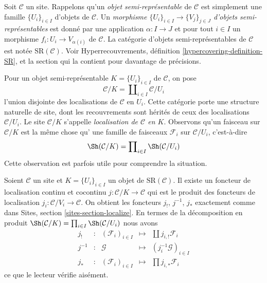 \noindent
Soit $\mathcal{C}$ un site. Rappelons qu'un {\it objet semi-représentable}
de $\mathcal{C}$ est simplement une famille $\{U_i\}_{i \in I}$
d'objets de $\mathcal{C}$. Un
{\it morphisme $\{U_i\}_{i \in I} \to \{V_j\}_{j \in J}$ d'objets
semi-représentables} est donné par une application $\alpha : I \to J$
et pour tout $i \in I$ un morphisme $f_i : U_i \to V_{\alpha(i)}$
de $\mathcal{C}$.
La catégorie d'objets semi-représentables de $\mathcal{C}$
est notée $\text{SR}(\mathcal{C})$.
Voir Hyperrecouvrements, définition \ref{hypercovering-definition-SR},
et la section qui la contient pour davantage de précisions.

\medskip\noindent
Pour un objet semi-représentable $K = \{U_i\}_{i \in I}$ de $\mathcal{C}$,
on pose
$$
\mathcal{C}/K = \coprod\nolimits_{i \in I} \mathcal{C}/U_i
$$
l'union disjointe des localisations de $\mathcal{C}$ en $U_i$.
Cette catégorie porte une structure naturelle de site, dont les recouvrements sont
hérités de ceux des localisations $\mathcal{C}/U_i$.
Le site $\mathcal{C}/K$ s'appelle
{\it localisation de $\mathcal{C}$ en $K$}.
Observons qu'un faisceau sur $\mathcal{C}/K$ est la même chose qu'
une famille de faisceaux $\mathcal{F}_i$ sur $\mathcal{C}/U_i$, c'est-à-dire
$$
\Sh(\mathcal{C}/K) = \prod\nolimits_{i \in I} \Sh(\mathcal{C}/U_i)
$$
Cette observation est parfois utile pour comprendre la situation.

\medskip\noindent
Soient $\mathcal{C}$ un site et $K = \{U_i\}_{i \in I}$ un objet de
$\text{SR}(\mathcal{C})$. Il existe un foncteur de localisation
continu et cocontinu $j : \mathcal{C}/K \to \mathcal{C}$ qui est
le produit des foncteurs de localisation
$j_i : \mathcal{C}/V_i \to \mathcal{C}$.
On obtient les foncteurs $j_!$, $j^{-1}$, $j_*$ exactement
comme dans Sites, section \ref{sites-section-localize}.
En termes de la décomposition en produit
$\Sh(\mathcal{C}/K) = \prod\nolimits_{i \in I} \Sh(\mathcal{C}/U_i)$
nous avons
$$
\begin{matrix}
j_! & : &
(\mathcal{F}_i)_{i \in I} &
\longmapsto &
\coprod j_{i, !}\mathcal{F}_i \\
j^{-1} & : &
\mathcal{G} &
\longmapsto &
(j_i^{-1}\mathcal{G})_{i \in I} \\
j_* & : &
(\mathcal{F}_i)_{i \in I} &
\longmapsto &
\prod j_{i, *}\mathcal{F}_i
\end{matrix}
$$
ce que le lecteur vérifie aisément.

